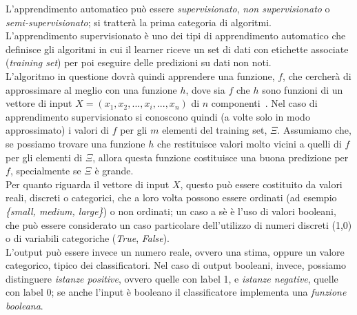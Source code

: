 \documentclass{article}
\begin{document}
	L'apprendimento automatico può essere \textit{supervisionato}, \textit{non supervisionato} o \textit{semi-supervisionato}; si tratterà la prima categoria di algoritmi.\\
	L'apprendimento supervisionato è uno dei tipi di apprendimento automatico che definisce gli algoritmi in cui il learner riceve un set di dati con etichette associate (\textit{training set}) per poi eseguire delle predizioni su dati non noti.\\
	L'algoritmo in questione dovrà quindi apprendere una funzione, $f$, che cercherà di approssimare al meglio con una funzione $h$, dove sia $f$ che $h$ sono funzioni di un vettore di input $X=(x_1,x_2,...,x_i,...,x_n)$ di $n$ componenti~\cite{bib:ml}.
	Nel caso di apprendimento supervisionato si conoscono quindi (a volte solo in modo approssimato) i valori di $f$ per gli $m$ elementi del training set, $\Xi$. Assumiamo che, se possiamo trovare una funzione $h$ che restituisce valori molto vicini a quelli di $f$ per gli elementi di $\Xi$, allora questa funzione costituisce una buona predizione per $f$, specialmente se $\Xi$ è grande.\\
	
	Per quanto riguarda il vettore di input $X$, questo può essere costituito da valori reali, discreti o categorici, che a loro volta possono essere ordinati (ad esempio \textit{\{small, medium, large\}}) o non ordinati; un caso a sè è l'uso di valori booleani, che può essere considerato un caso particolare dell'utilizzo di numeri discreti (1,0) o di variabili categoriche (\textit{True}, \textit{False}).\\
	L'output può essere invece un numero reale, ovvero una stima, oppure un valore categorico, tipico dei classificatori. Nel caso di output booleani, invece, possiamo distinguere \textit{istanze positive}, ovvero quelle con label 1, e \textit{istanze negative}, quelle con label 0; se anche l'input è booleano il classificatore implementa una \textit{funzione booleana}.\\
	
\end{document}
